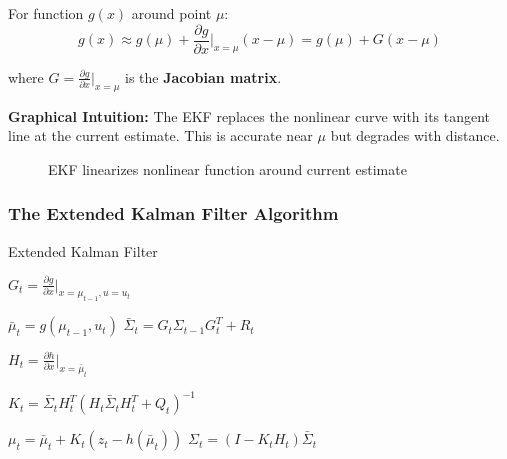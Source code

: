 For function $g(x)$ around point $\mu$:
\begin{equation}
g(x) \approx g(\mu) + \frac{\partial g}{\partial x}\bigg|_{x=\mu}(x - \mu) = g(\mu) + G(x - \mu)
\end{equation}

where $G = \frac{\partial g}{\partial x}\bigg|_{x=\mu}$ is the \textbf{Jacobian matrix}.

\textbf{Graphical Intuition:} The EKF replaces the nonlinear curve with its tangent line at the current estimate. This is accurate near $\mu$ but degrades with distance.

\begin{figure}[H]
\centering
{}
\caption{EKF linearizes nonlinear function around current estimate}
\end{figure}

\subsubsection{The Extended Kalman Filter Algorithm}

\begin{algorithm}[H]
\caption{Extended Kalman Filter}

\BlankLine
{}
$G_t = \frac{\partial g}{\partial x}\bigg|_{x=\mu_{t-1}, u=u_t}$\;

\BlankLine
{}
$\bar{\mu}_t = g(\mu_{t-1}, u_t)$\;
$\bar{\Sigma}_t = G_t \Sigma_{t-1} G_t^T + R_t$\;

\BlankLine
{}
$H_t = \frac{\partial h}{\partial x}\bigg|_{x=\bar{\mu}_t}$\;

\BlankLine
{}
$K_t = \bar{\Sigma}_t H_t^T (H_t \bar{\Sigma}_t H_t^T + Q_t)^{-1}$\;

\BlankLine
{}
$\mu_t = \bar{\mu}_t + K_t (z_t - h(\bar{\mu}_t))$\;
$\Sigma_t = (I - K_t H_t)\bar{\Sigma}_t$\;

\BlankLine
{}
\end{algorithm}

